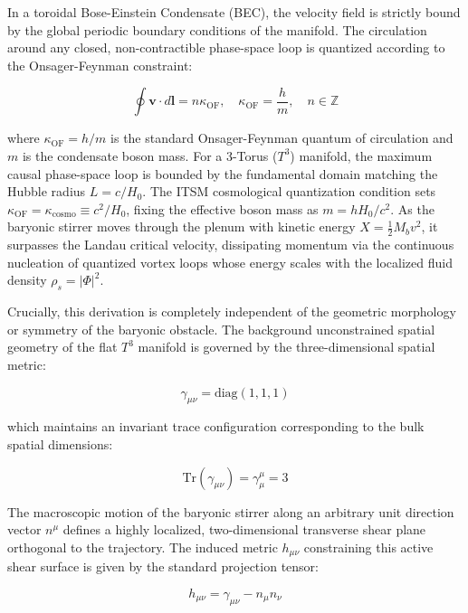 \documentclass[aps,prd,10pt,twocolumn,superscriptaddress,nofootinbib]{revtex4-2}
\begin{document}
In a toroidal Bose-Einstein Condensate (BEC), the velocity field is strictly bound by the global periodic boundary conditions of the manifold. The circulation around any closed, non-contractible phase-space loop is quantized according to the Onsager-Feynman constraint:

\begin{equation}
\oint \mathbf{v} \cdot d\mathbf{l} = n \kappa_{\text{OF}}, \quad \kappa_{\text{OF}} = \frac{h}{m}, \quad n \in \mathbb{Z}
\end{equation}

where $\kappa_{\text{OF}} = h/m$ is the standard Onsager-Feynman quantum of circulation and $m$ is the condensate boson mass. For a 3-Torus ($T^3$) manifold, the maximum causal phase-space loop is bounded by the fundamental domain matching the Hubble radius $L = c/H_0$. The ITSM cosmological quantization condition sets $\kappa_{\text{OF}} = \kappa_{\text{cosmo}} \equiv c^2 / H_0$, fixing the effective boson mass as $m = h H_0/c^2$. As the baryonic stirrer moves through the plenum with kinetic energy $X = \frac{1}{2}M_b v^2$, it surpasses the Landau critical velocity, dissipating momentum via the continuous nucleation of quantized vortex loops whose energy scales with the localized fluid density $\rho_s = |\Phi|^2$.

Crucially, this derivation is completely independent of the geometric morphology or symmetry of the baryonic obstacle. The background unconstrained spatial geometry of the flat $T^3$ manifold is governed by the three-dimensional spatial metric:

\begin{equation}
\gamma_{\mu\nu} = \text{diag}(1, 1, 1)
\end{equation}

which maintains an invariant trace configuration corresponding to the bulk spatial dimensions:

\begin{equation}
\text{Tr}(\gamma_{\mu\nu}) = \gamma^\mu_\mu = 3
\end{equation}

The macroscopic motion of the baryonic stirrer along an arbitrary unit direction vector $n^\mu$ defines a highly localized, two-dimensional transverse shear plane orthogonal to the trajectory. The induced metric $h_{\mu\nu}$ constraining this active shear surface is given by the standard projection tensor:

\begin{equation}
h_{\mu\nu} = \gamma_{\mu\nu} - n_{\mu}n_{\nu}
\end{equation}
\end{document}
